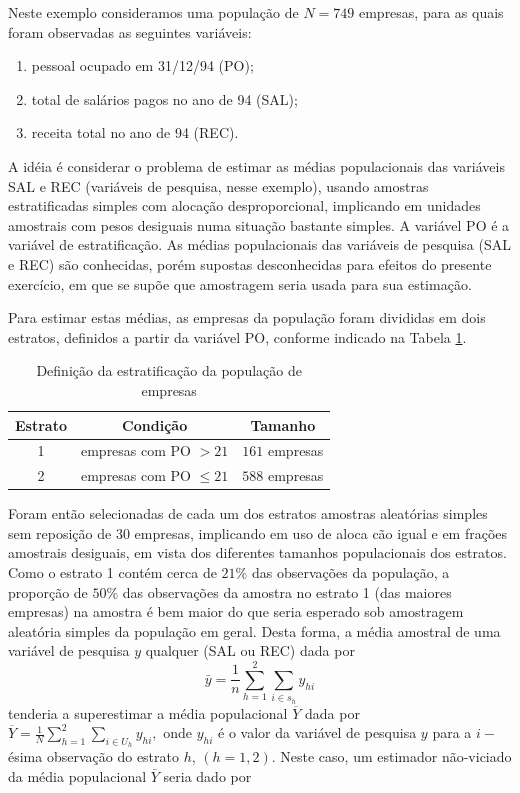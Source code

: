 \documentclass[]{book}
\numberwithin{example}{chapter}
\numberwithin{remark}{chapter}
\numberwithin{definition}{chapter}
\begin{document}
Neste exemplo consideramos uma população de \(N=749\) empresas, para as
quais foram observadas as seguintes variáveis:

\begin{enumerate}
\def\labelenumi{\arabic{enumi}.}
\item
  pessoal ocupado em 31/12/94 (PO);
\item
  total de salários pagos no ano de 94 (SAL);
\item
  receita total no ano de 94 (REC).
\end{enumerate}

A idéia é considerar o problema de estimar as médias populacionais das
variáveis SAL e REC (variáveis de pesquisa, nesse exemplo), usando
amostras estratificadas simples com alocação desproporcional, implicando
em unidades amostrais com pesos desiguais numa situação bastante
simples. A variável PO é a variável de estratificação. As médias
populacionais das variáveis de pesquisa (SAL e REC) são conhecidas,
porém supostas desconhecidas para efeitos do presente exercício, em que
se supõe que amostragem seria usada para sua estimação.

Para estimar estas médias, as empresas da população foram divididas em
dois estratos, definidos a partir da variável PO, conforme indicado na
Tabela \ref{tab42}.

\begin{center}
\begin{table}[tbp] \centering
\caption{Definição da estratificação da população de empresas}\bigskip \label{tab42} 
\begin{tabular}{|c|c|c|}
\hline
Estrato & Condição & Tamanho \\ \hline
1 & empresas com PO  $>21$ & $161$ empresas \\ \hline
2 & empresas com PO $\leq21$ & $588$ empresas \\ \hline
\end{tabular}
\end{table}
\end{center}

Foram então selecionadas de cada um dos estratos amostras aleatórias
simples sem reposição de \(30\) empresas, implicando em uso de aloca\c{%
c}ão igual e em frações amostrais desiguais, em vista dos diferentes
tamanhos populacionais dos estratos. Como o estrato 1 contém cerca de
\(21\%\) das observações da população, a proporção de \(50\%\) das
observações da amostra no estrato 1 (das maiores empresas) na amostra é
bem maior do que seria esperado sob amostragem aleatória simples da
população em geral. Desta forma, a média amostral de uma variável de
pesquisa \(y\) qualquer (SAL ou REC) dada por \[
\bar{y}=\frac{1}{n}\sum\limits_{h=1}^{2}\sum\limits_{i\in s_{h}}y_{hi} \]
tenderia a superestimar a média populacional \(\overline{Y}\) dada por
\(\overline{Y}=\frac{1}{N}\sum\limits_{h=1}^{2}\sum_{i\in U_{h}}y_{hi},\)
onde \(y_{hi}\) é o valor da variável de pesquisa \(y\) para a
\(i-\)ésima observação do estrato \(h\), \((h=1,2)\). Neste caso, um
estimador não-viciado da média populacional \(\bar{Y}\) seria dado por
\end{document}
